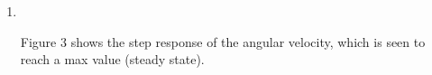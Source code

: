 \documentclass[a4paper,11pt]{article}
\begin{document}
\begin{enumerate}[label=\alph*)]
        \item  
        \begin{figure}[h]
        \centering
        \caption{}
        \end{figure} 

        Figure 3 shows the step response of the angular velocity, which is seen to reach a max value (steady state).
\end{enumerate}

\newpage
\end{document}
